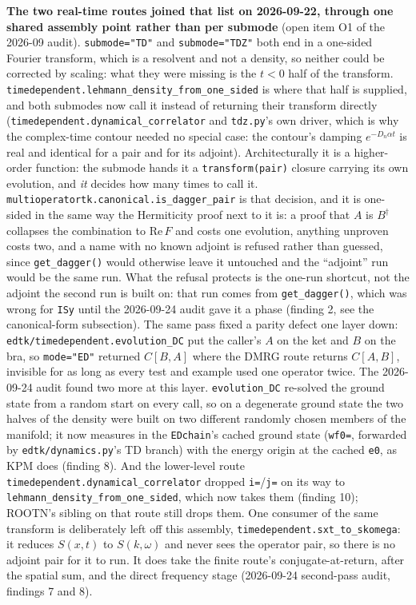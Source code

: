 \documentclass[11pt]{article}
\begin{document}
\textbf{The two real-time routes joined that list on 2026-09-22, through
one shared assembly point rather than per submode} (open item O1 of the
2026-09 audit). \texttt{submode="TD"} and \texttt{submode="TDZ"} both end
in a one-sided Fourier transform, which is a resolvent and not a density,
so neither could be corrected by scaling: what they were missing is the
$t<0$ half of the transform.
\texttt{timedependent.lehmann\_density\_from\_one\_sided} is where that
half is supplied, and both submodes now call it instead of returning
their transform directly
(\texttt{timedependent.dynamical\_correlator} and \texttt{tdz.py}'s own
driver, which is why the complex-time contour needed no special case:
the contour's damping $e^{-D_n\alpha t}$ is real and identical for a pair
and for its adjoint). Architecturally it is a higher-order function: the
submode hands it a \texttt{transform(pair)} closure carrying its own
evolution, and \emph{it} decides how many times to call it.
\texttt{multioperatortk.canonical.is\_dagger\_pair} is that decision, and
it is one-sided in the same way the Hermiticity proof next to it is: a
proof that $A$ is $B^\dagger$ collapses the combination to
$\mathrm{Re}\,F$ and costs one evolution, anything unproven costs two,
and a name with no known adjoint is refused rather than guessed, since
\texttt{get\_dagger()} would otherwise leave it untouched and the
``adjoint'' run would be the same run. What the refusal protects is the
one-run shortcut, not the adjoint the second run is built on: that run
comes from \texttt{get\_dagger()}, which was wrong for \texttt{ISy}
until the 2026-09-24 audit gave it a phase (finding 2, see the
canonical-form subsection). The same pass fixed a parity
defect one layer down: \texttt{edtk/timedependent.evolution\_DC} put the
caller's $A$ on the ket and $B$ on the bra, so \texttt{mode="ED"}
returned $C[B,A]$ where the DMRG route returns $C[A,B]$, invisible for as
long as every test and example used one operator twice. The 2026-09-24
audit found two more at this layer. \texttt{evolution\_DC}
re-solved the ground state from a random start on every call, so on a
degenerate ground state the two halves of the density were built on two different randomly chosen
members of the manifold; it now measures in the \texttt{EDchain}'s
cached ground state (\texttt{wf0=}, forwarded by
\texttt{edtk/dynamics.py}'s TD branch) with the energy origin at the
cached \texttt{e0}, as KPM does (finding 8). And the lower-level route
\texttt{timedependent.dynamical\_correlator} dropped
\texttt{i=}/\texttt{j=} on its way to
\texttt{lehmann\_density\_from\_one\_sided}, which now takes them
(finding 10); ROOTN's sibling on that route still drops them. One consumer of
the same transform is deliberately left off this assembly,
\texttt{timedependent.sxt\_to\_skomega}: it reduces $S(x,t)$ to
$S(k,\omega)$ and never sees the operator pair, so there is no adjoint
pair for it to run. It does take the finite route's conjugate-at-return,
after the spatial sum, and the direct frequency stage (2026-09-24
second-pass audit, findings 7 and 8).
\end{document}
